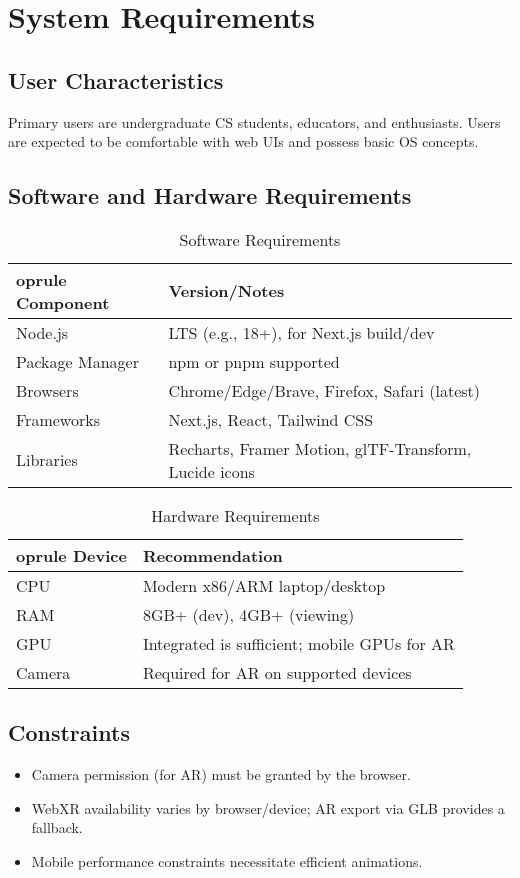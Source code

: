 \documentclass[12pt,a4paper,oneside]{report}
\begin{document}
\section{System Requirements}
\subsection{User Characteristics}
Primary users are undergraduate CS students, educators, and enthusiasts. Users are expected to be comfortable with web UIs and possess basic OS concepts.

\subsection{Software and Hardware Requirements}
\begin{table}[H]
  \centering
  \caption{Software Requirements}
  \begin{tabular}{p{} p{}}
    	oprule
    Component & Version/Notes \\
    \midrule
    Node.js & LTS (e.g., 18+), for Next.js build/dev \\
    Package Manager & npm or pnpm supported \\
    Browsers & Chrome/Edge/Brave, Firefox, Safari (latest) \\
    Frameworks & Next.js, React, Tailwind CSS \\
    Libraries & Recharts, Framer Motion, glTF-Transform, Lucide icons \\
    \bottomrule
  \end{tabular}
\end{table}

\begin{table}[H]
  \centering
  \caption{Hardware Requirements}
  \begin{tabular}{p{} p{}}
    	oprule
    Device & Recommendation \\
    \midrule
    CPU & Modern x86/ARM laptop/desktop \\
    RAM & 8GB+ (dev), 4GB+ (viewing) \\
    GPU & Integrated is sufficient; mobile GPUs for AR \\
    Camera & Required for AR on supported devices \\
    \bottomrule
  \end{tabular}
\end{table}

\subsection{Constraints}
\begin{itemize}
  \item Camera permission (for AR) must be granted by the browser.
  \item WebXR availability varies by browser/device; AR export via GLB provides a fallback.
  \item Mobile performance constraints necessitate efficient animations.
\end{itemize}
\end{document}
